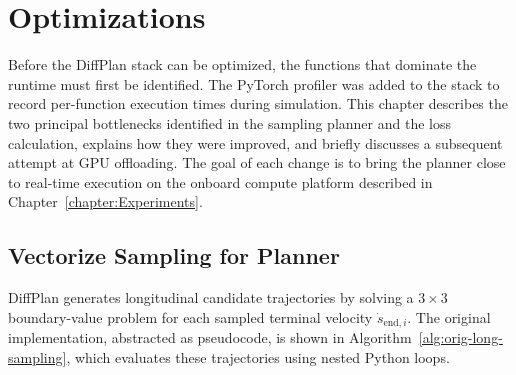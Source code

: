 
\chapter{Optimizations}
\label{chapter:optimizations}

Before the DiffPlan stack can be optimized, the functions that dominate the runtime must first be identified.
The PyTorch \cite{paszke_PyTorchImperativeStyle_2019} profiler was added to the stack to record per-function execution times during simulation.
This chapter describes the two principal bottlenecks identified in the sampling planner and the loss calculation, explains how they were improved, and briefly discusses a subsequent attempt at GPU offloading.
The goal of each change is to bring the planner close to real-time execution on the onboard compute platform described in Chapter~\ref{chapter:Experiments}.

\section{Vectorize Sampling for Planner}
\label{section:VecSampling}

DiffPlan generates longitudinal candidate trajectories by solving a $3 \times 3$ boundary-value problem for each sampled terminal velocity $\dot{s}_{\text{end}, i}$.
The original implementation, abstracted as pseudocode, is shown in Algorithm~\ref{alg:orig-long-sampling}, which evaluates these trajectories using nested Python loops.

